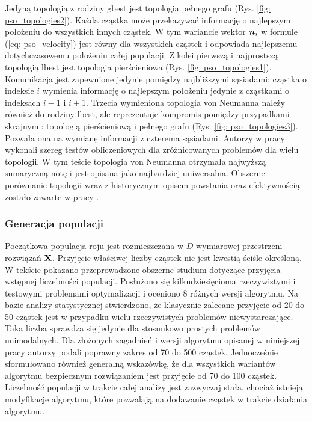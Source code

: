 Jedyną topologią z rodziny gbest jest topologia pełnego grafu (Rys. \ref{fig: pso_topologies2}). Każda cząstka może przekazywać informację o najlepszym położeniu do wszystkich innych cząstek. W tym wariancie wektor $\bm{n}_i$ w formule (\ref{eq: pso_velocity}) jest równy dla wszystkich cząstek i odpowiada najlepszemu dotychczasowemu położeniu całej populacji. Z kolei pierwszą i najprostszą topologią lbest jest topologia pierścieniowa (Rys. \ref{fig: pso_topologies1}). Komunikacja jest zapewnione jedynie pomiędzy najbliższymi sąsiadami: cząstka o indeksie $i$ wymienia informację o najlepszym położeniu jedynie z cząstkami o indeksach $i-1$ i $i+1$. Trzecia wymieniona topologia von Neumanna należy również do rodziny lbest, ale reprezentuje kompromis pomiędzy przypadkami skrajnymi: topologią pierścieniową i pełnego grafu (Rys. \ref{fig: pso_topologies3}). Pozwala ona na wymianę informacji z czterema sąsiadami. Autorzy w pracy \parencite{Kennedy2002} wykonali szereg testów obliczeniowych dla zróżnicowanych problemów dla wielu topologii. W tym teście topologia von Neumanna otrzymała najwyższą sumaryczną notę i jest opisana jako najbardziej uniwersalna. Obszerne porównanie topologii wraz z historycznym opisem powstania oraz efektywnością zostało zawarte w pracy \parencite{Blackwell2019}.

\subsubsection{Generacja populacji}
Początkowa populacja roju jest rozmieszczana w $D$-wymiarowej przestrzeni rozwiązań $\mathbf{X}$. Przyjęcie właściwej liczby cząstek nie jest kwestią ściśle określoną. W tekście \cite{Piotrowski2020} pokazano przeprowadzone obszerne studium dotyczące przyjęcia wstępnej liczebności populacji. Posłużono się kilkudziesięcioma rzeczywistymi i testowymi problemami optymalizacji i oceniono 8 różnych wersji algorytmu. Na bazie analizy statystycznej stwierdzono, że klasycznie zalecane przyjęcie od 20 do 50 cząstek \parencite{Kennedy1995,Liang2006,Chen2012,Harrison2018} jest w przypadku wielu rzeczywistych problemów niewystarczające. Taka liczba sprawdza się jedynie dla stosunkowo prostych problemów unimodalnych. Dla złożonych zagadnień i wersji algorytmu opisanej w niniejszej pracy autorzy podali poprawny zakres od 70 do 500 cząstek. Jednocześnie sformułowano również generalną wskazówkę, że dla wszystkich wariantów algorytmu bezpiecznym rozwiązaniem jest przyjęcie od 70 do 100 cząstek. Liczebność populacji w trakcie całej analizy jest zazwyczaj stała, chociaż istnieją modyfikacje algorytmu, które pozwalają na dodawanie cząstek w trakcie działania algorytmu.

